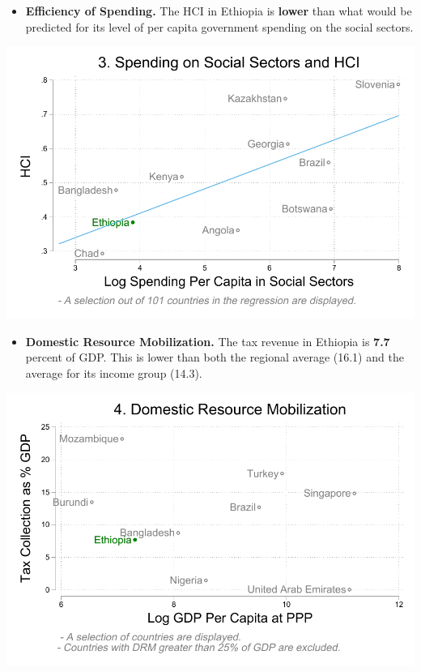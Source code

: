 \documentclass[9.2pt,twocolumn]{article}
\providecommand{\tightlist}{%
  \setlength{\itemsep}{0pt}\setlength{\parskip}{0pt}}
\begin{document}
\begin{itemize}
\tightlist
\item
  \textbf{Efficiency of Spending.} The HCI in Ethiopia is \textbf{lower}
  than what would be predicted for its level of per capita government
  spending on the social sectors.
\end{itemize}

\begin{center}\includegraphics[width=1\linewidth,height=0.5\textheight]{charts/efficiency_ETH} \end{center}

\begin{itemize}
\tightlist
\item
  \textbf{Domestic Resource Mobilization.} The tax revenue in Ethiopia
  is \textbf{7.7} percent of GDP. This is lower than both the regional
  average (16.1) and the average for its income group (14.3).
\end{itemize}

\begin{flushright}\includegraphics[width=1\linewidth,height=0.5\textheight]{charts/drm_ETH} \end{flushright}
\end{document}
